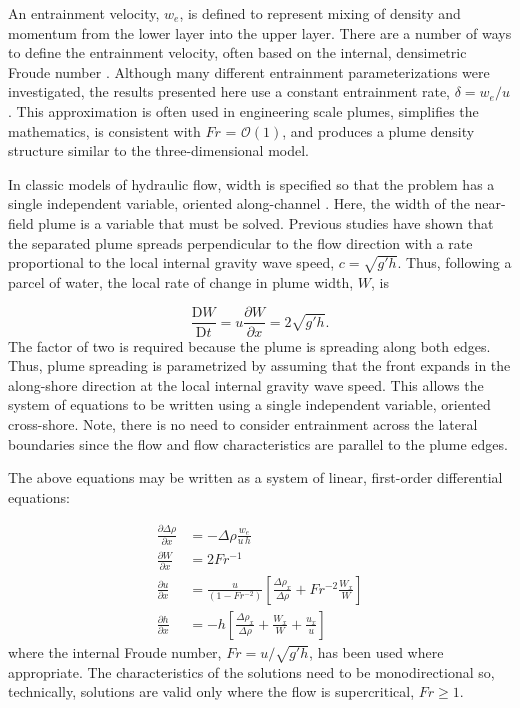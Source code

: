 \documentclass[11pt]{report}
\numberwithin{equation}{section}
\begin{document}
An entrainment velocity, $w_e$, is defined to represent mixing of density and momentum from the lower layer into the upper layer.  There are a number of ways to define the entrainment velocity, often based on the internal, densimetric Froude number \citep[e.g.,][]{ellison.turner:59, turner:73, cenedese.ea:04}.  Although many different entrainment parameterizations were investigated, the results presented here use a constant entrainment rate, $\delta = w_e/u$.  This approximation is often used in engineering scale plumes, simplifies the mathematics, is consistent with $Fr$ = $\mathcal{O}(1)$, and produces a plume density structure similar to the three-dimensional model.  

In classic models of hydraulic flow, width is specified so that the problem has a single independent variable, oriented along-channel \citep[see][]{armi.farmer:86,turner:73,baines:95}.  Here, the width of the near-field plume is a variable that must be solved.  Previous studies \citep{wright.coleman:71, hetland.macdonald:08} have shown that the separated plume spreads perpendicular to the flow direction with a rate proportional to the local internal gravity wave speed, $c = \sqrt{g' h}$.  Thus, following a parcel of water, the local rate of change in plume width, $W$, is

\begin{equation}
\frac{\mathrm{D} W}{\mathrm{D} t} = u \frac{\partial W}{\partial x} = 2 \sqrt{g' h}. \label{eq:width_full}
\end{equation}
The factor of two is required because the plume is spreading along both edges.  Thus, plume spreading is parametrized by assuming that the front expands in the along-shore direction at the local internal gravity wave speed.  This allows the system of equations to be written using a single independent variable, oriented cross-shore.  Note, there is no need to consider entrainment across the lateral boundaries \citep[as in, e.g.,][]{odonnell:90} since the flow and flow characteristics are parallel to the plume edges.  

The above equations may be written as a system of linear, first-order differential equations:

\begin{align}
\frac{\partial \Delta\rho}{\partial x} &= - \Delta \rho \frac{w_e}{u\,h} \label{eq:mass_sys}\\
\frac{\partial W}{\partial x} &=  2 Fr^{-1}\label{eq:width_sys}\\
\frac{\partial u}{\partial x} &= \frac{u}{(1 - Fr^{-2})}\left[ \frac{\Delta \rho_x}{\Delta \rho} + Fr^{-2} \frac{W_x}{W} \right] \label{eq:moment_sys}\\
\frac{\partial h}{\partial x} &= - h \left[  \frac{\Delta\rho_x}{\Delta\rho} + \frac{W_x}{W} +  \frac{u_x}{u} \right] \label{eq:cont_sys}
\end{align}
where the internal Froude number, $Fr = u/\sqrt{g' h}$, has been used where appropriate.  The characteristics of the solutions need to be monodirectional so, technically, solutions are valid only where the flow is supercritical, $Fr \ge 1$.
\end{document}
